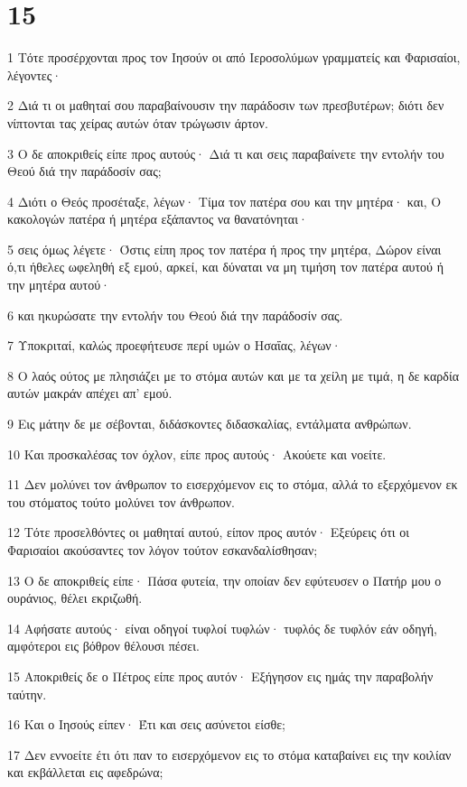 \chapter{15}

\par 1 Τότε προσέρχονται προς τον Ιησούν οι από Ιεροσολύμων γραμματείς και Φαρισαίοι, λέγοντες·
\par 2 Διά τι οι μαθηταί σου παραβαίνουσιν την παράδοσιν των πρεσβυτέρων; διότι δεν νίπτονται τας χείρας αυτών όταν τρώγωσιν άρτον.
\par 3 Ο δε αποκριθείς είπε προς αυτούς· Διά τι και σεις παραβαίνετε την εντολήν του Θεού διά την παράδοσίν σας;
\par 4 Διότι ο Θεός προσέταξε, λέγων· Τίμα τον πατέρα σου και την μητέρα· και, Ο κακολογών πατέρα ή μητέρα εξάπαντος να θανατόνηται·
\par 5 σεις όμως λέγετε· Όστις είπη προς τον πατέρα ή προς την μητέρα, Δώρον είναι ό,τι ήθελες ωφεληθή εξ εμού, αρκεί, και δύναται να μη τιμήση τον πατέρα αυτού ή την μητέρα αυτού·
\par 6 και ηκυρώσατε την εντολήν του Θεού διά την παράδοσίν σας.
\par 7 Υποκριταί, καλώς προεφήτευσε περί υμών ο Ησαΐας, λέγων·
\par 8 Ο λαός ούτος με πλησιάζει με το στόμα αυτών και με τα χείλη με τιμά, η δε καρδία αυτών μακράν απέχει απ' εμού.
\par 9 Εις μάτην δε με σέβονται, διδάσκοντες διδασκαλίας, εντάλματα ανθρώπων.
\par 10 Και προσκαλέσας τον όχλον, είπε προς αυτούς· Ακούετε και νοείτε.
\par 11 Δεν μολύνει τον άνθρωπον το εισερχόμενον εις το στόμα, αλλά το εξερχόμενον εκ του στόματος τούτο μολύνει τον άνθρωπον.
\par 12 Τότε προσελθόντες οι μαθηταί αυτού, είπον προς αυτόν· Εξεύρεις ότι οι Φαρισαίοι ακούσαντες τον λόγον τούτον εσκανδαλίσθησαν;
\par 13 Ο δε αποκριθείς είπε· Πάσα φυτεία, την οποίαν δεν εφύτευσεν ο Πατήρ μου ο ουράνιος, θέλει εκριζωθή.
\par 14 Αφήσατε αυτούς· είναι οδηγοί τυφλοί τυφλών· τυφλός δε τυφλόν εάν οδηγή, αμφότεροι εις βόθρον θέλουσι πέσει.
\par 15 Αποκριθείς δε ο Πέτρος είπε προς αυτόν· Εξήγησον εις ημάς την παραβολήν ταύτην.
\par 16 Και ο Ιησούς είπεν· Έτι και σεις ασύνετοι είσθε;
\par 17 Δεν εννοείτε έτι ότι παν το εισερχόμενον εις το στόμα καταβαίνει εις την κοιλίαν και εκβάλλεται εις αφεδρώνα;
